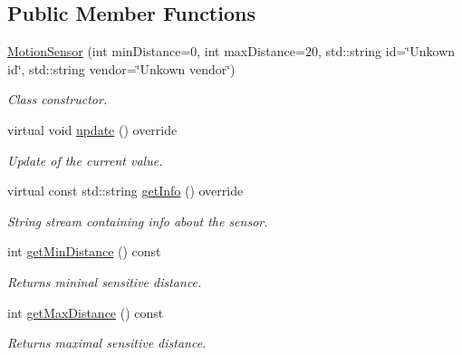 \subsection*{Public Member Functions}
\begin{DoxyCompactItemize}
\item 
\hyperlink{classMotionSensor_a411baafe617c6e11c10aaa0e1ec6a9f4}{Motion\+Sensor} (int min\+Distance=0, int max\+Distance=20, std\+::string id=\char`\"{}Unkown id\char`\"{}, std\+::string vendor=\char`\"{}Unkown vendor\char`\"{})
\begin{DoxyCompactList}\small\item\em Class constructor. \end{DoxyCompactList}\item 
virtual void \hyperlink{classMotionSensor_a8e71f20dc63f45669377e6efc4d7c6df}{update} () override
\begin{DoxyCompactList}\small\item\em Update of the current value. \end{DoxyCompactList}\item 
virtual const std\+::string \hyperlink{classMotionSensor_a800b65765d7d5064b6b06d9c4e8c5bf2}{get\+Info} () override\hypertarget{classMotionSensor_a800b65765d7d5064b6b06d9c4e8c5bf2}{}\label{classMotionSensor_a800b65765d7d5064b6b06d9c4e8c5bf2}

\begin{DoxyCompactList}\small\item\em String stream containing info about the sensor. \end{DoxyCompactList}\item 
int \hyperlink{classMotionSensor_aa19bf311e57fc21276d2eb74190cb709}{get\+Min\+Distance} () const \hypertarget{classMotionSensor_aa19bf311e57fc21276d2eb74190cb709}{}\label{classMotionSensor_aa19bf311e57fc21276d2eb74190cb709}

\begin{DoxyCompactList}\small\item\em Returns mininal sensitive distance. \end{DoxyCompactList}\item 
int \hyperlink{classMotionSensor_af095104075a3e5cb7c6c6466c8813f26}{get\+Max\+Distance} () const \hypertarget{classMotionSensor_af095104075a3e5cb7c6c6466c8813f26}{}\label{classMotionSensor_af095104075a3e5cb7c6c6466c8813f26}

\begin{DoxyCompactList}\small\item\em Returns maximal sensitive distance. \end{DoxyCompactList}\end{DoxyCompactItemize}

